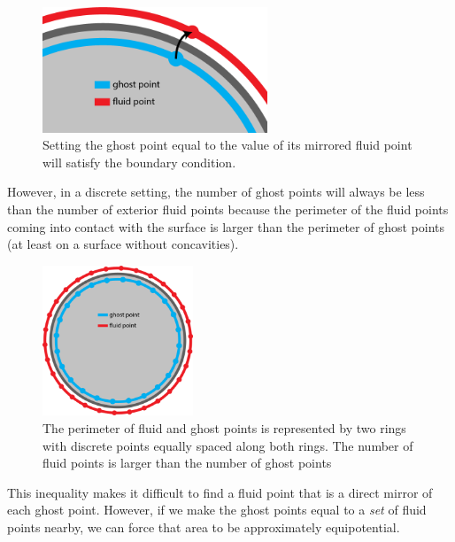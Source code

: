 \documentclass[11pt]{article}
\begin{document}
\begin{figure} [H] %
	\centering

	\includegraphics[width=0.6\textwidth]{lin_graphic.png}
	\caption{Setting the ghost point equal to the value of its mirrored fluid point will satisfy the boundary condition.}
\end{figure}

However, in a discrete setting, the number of ghost points will always be less than the number of exterior fluid points because the perimeter of the fluid points coming into contact with the surface is larger than the perimeter of ghost points (at least on a surface without concavities).

\begin{figure} [H] %
	\centering

	\includegraphics[width=0.40\textwidth]{lin_graphic_2.png}
	\caption{The perimeter of fluid and ghost points is represented by two rings with discrete points equally spaced along both rings. The number of fluid points is larger than the number of ghost points}
\end{figure}

This inequality makes it difficult to find a fluid point that is a direct mirror of each ghost point. However, if we make the ghost points equal to a \textit{set} of fluid points nearby, we can force that area to be approximately equipotential.
\end{document}
